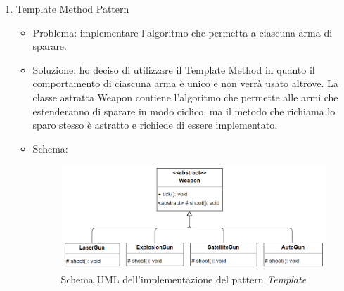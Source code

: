 \documentclass[a4paper,12pt]{report}
\begin{document}
\begin{enumerate}
\begin{itemize}
	\end{itemize}
	\item Template Method Pattern
	\begin{itemize}
		\item Problema: implementare l'algoritmo che permetta a ciascuna arma di sparare.
		\item Soluzione: ho deciso di utilizzare il Template Method in quanto il comportamento di ciascuna arma è unico e non verrà usato altrove.
		La classe astratta Weapon contiene l'algoritmo che permette alle armi che estenderanno di sparare in modo ciclico, ma il metodo che richiama lo sparo stesso è astratto e richiede di essere implementato.
		\item Schema:
		\begin{figure}[H]
			\centering{}
			\includegraphics[width=\textwidth]{img/template.png}
			\caption{Schema UML dell'implementazione del pattern \emph{Template}}
			\label{img:Template Pattern}
		\end{figure}
	\end{itemize}
	
	
	
\end{enumerate}
%
\end{document}
